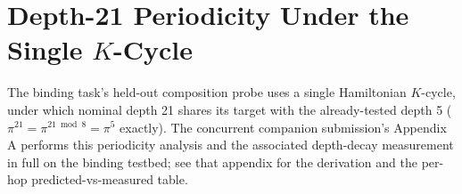 \documentclass[mlabstract,onecolumn]{jmlr}
\begin{document}
\section{Depth-21 Periodicity Under the Single $K$-Cycle}
\label{app:period}

The binding task's held-out composition probe uses a single Hamiltonian
$K$-cycle, under which nominal depth 21 shares its target with the
already-tested depth 5 ($\pi^{21} = \pi^{21 \bmod 8} = \pi^5$ exactly).
The concurrent companion submission's Appendix A performs this
periodicity analysis and the associated depth-decay measurement in full
on the binding testbed; see that appendix for the derivation and the
per-hop predicted-vs-measured table.



\end{document}
